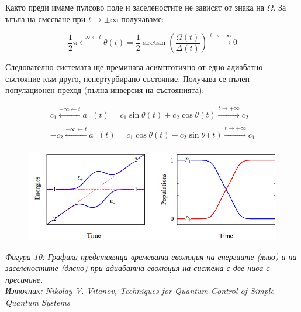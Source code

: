     Както преди имаме пулсово поле и заселеностите не зависят от знака на $\Omega$.
    За ъгъла на смесване при $t\rightarrow \pm \infty$ получаваме:



    \begin{equation}
        \frac{1}{2}\pi \xleftarrow[]{-\infty\leftarrow t}\theta (t) = \frac{1}{2}\arctan \left(\frac{\Omega(t)}{\Delta(t)}\right)\xrightarrow[]{t\rightarrow + \infty} 0
    \end{equation}

    Следователно системата ще преминава асимптотично от едно адиабатно състояние към друго, непертурбирано състояние. Получава се пълен популационен преход (пълна инверсия на състоянията):

    \begin{align}
        c_1\xleftarrow[]{-\infty\leftarrow t}a_+(t) = c_1 \sin\theta (t) + c_2 \cos\theta (t) \xrightarrow[]{t\rightarrow + \infty} c_2\\
        -c_2 \xleftarrow[]{-\infty\leftarrow t} a_-(t) = c_1 \cos\theta (t) - c_2 \sin\theta (t)\xrightarrow[]{t\rightarrow + \infty} c_1
    \end{align}
    
    \begin{figure}[H]
        \centering
        \includegraphics[width=370pt]{5.png}
    \end{figure}
    \begin{center}
        \small \textit{Фигура 10: Графика представяща времевата еволюция на енергиите (ляво) и на заселеностите (дясно) при адиабатна еволюция на система с две нива с пресичане.\\
        Източник: Nikolay V. Vitanov, Techniques for Quantum Control of Simple Quantum Systems \cite{sussex_vitanov}}
    \end{center}

